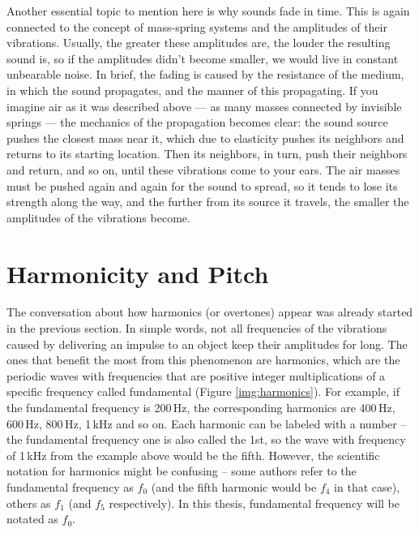 
Another essential topic to mention here is why sounds fade in time. This is again connected to the concept of mass-spring systems and the amplitudes of their vibrations. Usually, the greater these amplitudes are, the louder the resulting sound is, so if the amplitudes didn’t become smaller, we would live in constant unbearable noise. In brief, the fading is caused by the resistance of the medium, in which the sound propagates, and the manner of this propagating. If you imagine air as it was described above --- as many masses connected by invisible springs --- the mechanics of the propagation becomes clear: the sound source pushes the closest mass near it, which due to elasticity pushes its neighbors and returns to its starting location. Then its neighbors, in turn, push their neighbors and return, and so on, until these vibrations come to your ears. The air masses must be pushed again and again for the sound to spread, so it tends to lose its strength along the way, and the further from its source it travels, the smaller the amplitudes of the vibrations become.

\section{Harmonicity and Pitch}

The conversation about how harmonics (or overtones) appear was already started in the previous section. In simple words, not all frequencies of the vibrations caused by delivering an impulse to an object keep their amplitudes for long. The ones that benefit the most from this phenomenon are harmonics, which are the periodic waves with frequencies that are positive integer multiplications of a specific frequency called fundamental (Figure \ref{img:harmonics}). For example, if the fundamental frequency is 200\,Hz, the corresponding harmonics are 400\,Hz, 600\,Hz, 800\,Hz, 1\,kHz and so on. Each harmonic can be labeled with a number -- the fundamental frequency one is also called the 1st, so the wave with frequency of 1\,kHz from the example above would be the fifth. However, the scientific notation for harmonics might be confusing -- some authors refer to the fundamental frequency as $f_0$ (and the fifth harmonic would be $f_4$ in that case), others as $f_1$ (and $f_5$ respectively). In this thesis, fundamental frequency will be notated as $f_0$.\\

